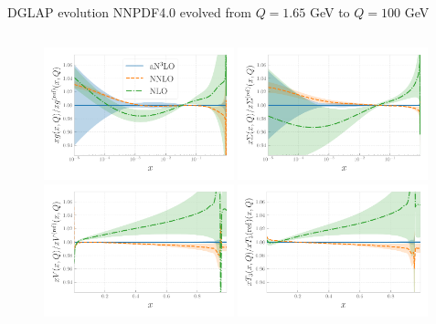\documentclass[8pt,t]{beamer}
\begin{document}
\begin{frame}{DGLAP evolution}
  NNPDF4.0 evolved from $Q=1.65$ GeV to $Q=100$ GeV

  \begin{columns}
    \begin{column}{0.59\textwidth}
      \begin{figure}[!t]
        \centering
        \includegraphics[width=0.49\textwidth]{figures/N3LOevolution-q100gev-ratios_expanded_0.pdf}
        \includegraphics[width=0.49\textwidth]{figures/N3LOevolution-q100gev-ratios_expanded_1.pdf}\\
        \includegraphics[width=0.49\textwidth]{figures/N3LOevolution-q100gev-ratios_expanded_2.pdf}
        \includegraphics[width=0.49\textwidth]{figures/N3LOevolution-q100gev-ratios_expanded_3.pdf}

\end{figure}
\end{column}
\end{columns}
\end{frame}
\end{document}
